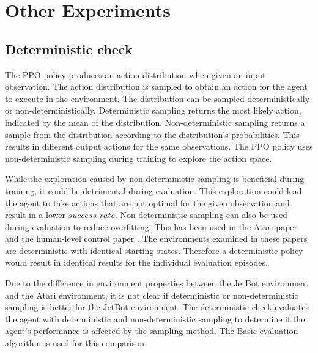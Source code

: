 








\section{Other Experiments}

\subsection{Deterministic check}
\label{sec:deterministic_check}

The PPO policy produces an action distribution when given an input observation. The action distribution is sampled to obtain an action for the agent to execute in the environment. The distribution can be sampled deterministically or non-deterministically. Deterministic sampling returns the most likely action, indicated by the mean of the distribution. Non-deterministic sampling returns a sample from the distribution according to the distribution's probabilities. This results in different output actions for the same observations. The PPO policy uses non-deterministic sampling during training to explore the action space. 

While the exploration caused by non-deterministic sampling is beneficial during training, it could be detrimental during evaluation. This exploration could lead the agent to take actions that are not optimal for the given observation and result in a lower $success\_rate$. Non-deterministic sampling can also be used during evaluation to reduce overfitting. This has been used in the Atari paper \autocite{atari} and the human-level control paper \autocite{human_level_control}. The environments examined in these papers are deterministic with identical starting states. Therefore a deterministic policy would result in identical results for the individual evaluation episodes.

Due to the difference in environment properties between the JetBot environment and the Atari environment, it is not clear if deterministic or non-deterministic sampling is better for the JetBot environment. The deterministic check evaluates the agent with deterministic and non-deterministic sampling to determine if the agent's performance is affected by the sampling method. The Basic evaluation algorithm is used for this comparison.

